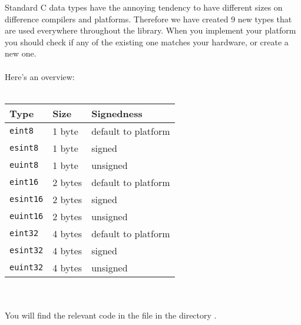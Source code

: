 Standard C data types have the annoying tendency to have different sizes on difference compilers
and platforms. Therefore we have created 9 new types that are used everywhere throughout the library.
When you implement your platform you should check if any of the existing one matches your hardware,
or create a new one.\\
\\
Here's an overview:\\\\
\begin{tabular}{|p{4cm}|l|l|}
	\hline
	\textbf{Type} & \textbf{Size} & \textbf{Signedness}\\
	\hline
	\hline
	\texttt{eint8} & 1 byte & default to platform \\
	\texttt{esint8} & 1 byte & signed \\
	\texttt{euint8} & 1 byte & unsigned \\
	\hline
	\texttt{eint16} & 2 bytes & default to platform \\
	\texttt{esint16} & 2 bytes & signed \\
	\texttt{euint16} & 2 bytes & unsigned \\
	\hline
	\texttt{eint32} & 4 bytes & default to platform \\
	\texttt{esint32} & 4 bytes & signed \\
	\texttt{euint32} & 4 bytes & unsigned \\
	\hline
\end{tabular}
$ $\\\\\\
You will find the relevant code in the file  in the directory .
